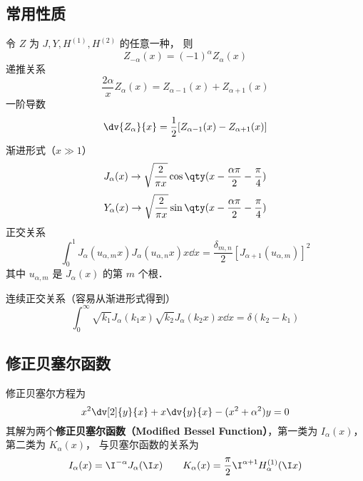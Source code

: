 \subsection{常用性质}
令 $Z$ 为 $J, Y, H^{(1)}, H^{(2)}$ 的任意一种， 则
\begin{equation}
Z_{-\alpha}(x) = (-1)^\alpha Z_\alpha(x)
\end{equation}
递推关系
\begin{equation}
\frac{2\alpha}{x} Z_\alpha(x) = Z_{\alpha -1}(x) + Z_{\alpha+1}(x)
\end{equation}
一阶导数
\begin{equation}
\dv{Z_\alpha}{x} = \frac12 [Z_{\alpha  - 1}(x) - Z_{\alpha +1}(x)]
\end{equation}
渐进形式（$x \gg 1$）
\begin{equation}
J_\alpha(x) \to \sqrt{\frac{2}{\pi x}} \cos\qty(x - \frac{\alpha\pi}{2} - \frac{\pi}{4})
\end{equation}
\begin{equation}
Y_\alpha(x) \to \sqrt{\frac{2}{\pi x}} \sin\qty(x - \frac{\alpha\pi}{2} - \frac{\pi}{4})
\end{equation}
正交关系
\begin{equation}
\int_0^1 J_\alpha (u_{\alpha ,m} x) J_\alpha (u_{\alpha ,n} x) x \dd{x} = \frac{\delta_{m,n}}{2}[J_{\alpha + 1} (u_{\alpha ,m})]^2
\end{equation}
其中 $u_{\alpha, m}$ 是 $J_\alpha(x)$ 的第 $m$ 个根．

连续正交关系（容易从渐进形式得到）
\begin{equation}
\int_0^\infty \sqrt{k_1} J_\alpha (k_1 x) \sqrt{k_2}J_\alpha (k_2 x) x \dd{x} = \delta(k_2 - k_1)
\end{equation}

\subsection{修正贝塞尔函数}
修正贝塞尔方程为
\begin{equation}
x^2 \dv[2]{y}{x} + x \dv{y}{x} - (x^2 + \alpha ^2)y = 0
\end{equation}
其解为两个\textbf{修正贝塞尔函数（Modified Bessel Function）}，第一类为 $I_\alpha(x)$，  第二类为 $K_\alpha(x)$，  与贝塞尔函数的关系为
\begin{equation}
I_\alpha(x) = \I^{-\alpha} J_\alpha(\I x)
\qquad
K_\alpha(x) = \frac{\pi}{2} \I^{\alpha  + 1} H_\alpha ^{(1)}(\I x)
\end{equation}
